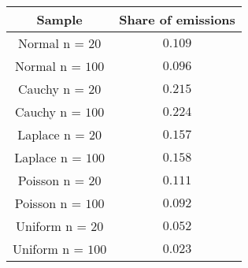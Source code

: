 \begin{tabular}{|c|c|}
\hline
Sample & Share of emissions \\
\hline
Normal n = $20$ & $0.109$\\
\hline
Normal n = $100$ & $0.096$\\
\hline
Cauchy n = $20$ & $0.215$\\
\hline
Cauchy n = $100$ & $0.224$\\
\hline
Laplace n = $20$ & $0.157$\\
\hline
Laplace n = $100$ & $0.158$\\
\hline
Poisson n = $20$ & $0.111$\\
\hline
Poisson n = $100$ & $0.092$\\
\hline
Uniform n = $20$ & $0.052$\\
\hline
Uniform n = $100$ & $0.023$\\
\hline
\end{tabular}